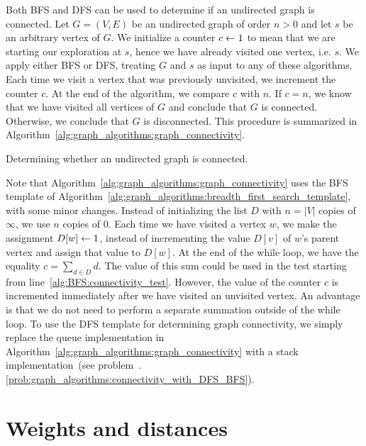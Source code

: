 Both BFS and DFS can be used to determine if an
undirected graph is connected. Let $G = (V, E)$ be an undirected graph
of order $n > 0$ and let $s$ be an arbitrary vertex of $G$. We
initialize a counter $c \leftarrow 1$ to mean that we are starting our
exploration at $s$, hence we have already visited one vertex,
i.e. $s$. We apply either BFS or DFS, treating
$G$ and $s$ as input to any of these algorithms. Each time we visit a
vertex that was previously unvisited, we increment the counter $c$. At
the end of the algorithm, we compare $c$ with $n$. If $c = n$, we know
that we have visited all vertices of $G$ and conclude that $G$ is
connected. Otherwise, we conclude that $G$ is disconnected. This
procedure is summarized in
Algorithm~\ref{alg:graph_algorithms:graph_connectivity}.

\begin{algorithm}[!htpb]

\caption{Determining whether an undirected graph is connected.}
\label{alg:graph_algorithms:graph_connectivity}
\end{algorithm}

Note that Algorithm~\ref{alg:graph_algorithms:graph_connectivity} uses
the BFS template of
Algorithm~\ref{alg:graph_algorithms:breadth_first_search_template},
with some minor changes. Instead of initializing the list $D$ with
$n = |V|$ copies of $\infty$, we use $n$ copies of $0$. Each time we
have visited a vertex $w$, we make the assignment $D[w] \leftarrow 1$,
instead of incrementing the value $D[v]$ of $w$'s parent vertex and
assign that value to $D[w]$. At the end of the while loop, we have the
equality $c = \sum_{d \in D} d$. The value of this sum could be used
in the test starting from line~\ref{alg:BFS:connectivity_test}.
However, the value of the counter $c$ is incremented immediately after
we have visited an unvisited vertex. An advantage is that we do not
need to perform a separate summation outside of the while loop. To use
the DFS template for determining graph
connectivity, we simply replace the
queue implementation in
Algorithm~\ref{alg:graph_algorithms:graph_connectivity} with a
stack implementation~(see
problem~\thechapter.\ref{prob:graph_algorithms:connectivity_with_DFS_BFS}).



\section{Weights and distances}
\label{sec:graph_algorithms:weights_distances}

